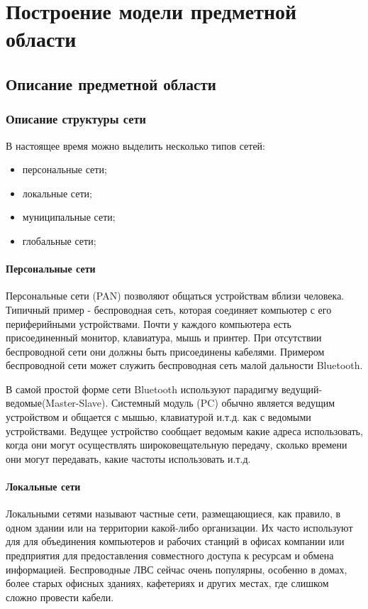 \newpage
\chapter{Построение модели предметной области}
    \section{Описание предметной области}
    \subsection{Описание структуры сети}

    В настоящее время можно выделить несколько типов сетей:
    \begin{itemize}
        \item персональные сети;
        \item локальные сети;
        \item муниципальные сети;
        \item глобальные сети;
    \end{itemize}

    \subsubsection{Персональные сети }

    Персональные сети (PAN) позволяют общаться устройствам вблизи человека. Типичный пример - беспроводная сеть, которая соединяет компьютер с его периферийными устройствами. Почти у каждого компьютера есть присоединенный монитор, клавиатура, мышь и принтер. При отсутствии беспроводной сети они должны быть присоединены кабелями. Примером беспроводной сети может служить беспроводная сеть малой дальности Bluetooth.

    В самой простой форме сети Bluetooth используют парадигму ведущий-ведомые(Master-Slave). Системный модуль (PC) обычно является ведущим устройством и общается с мышью, клавиатурой и.т.д. как с ведомыми устройствами. Ведущее устройство сообщает ведомым какие адреса использовать, когда они могут осуществлять широковещательную передачу, сколько времени они могут передавать, какие частоты использовать и.т.д.

    \subsubsection{Локальные сети}
    Локальными сетями называют частные сети, размещающиеся, как правило, в одном здании или на территории какой-либо организации. Их часто используют для для объединения компьютеров и рабочих станций в офисах компании или предприятия для предоставления совместного доступа к ресурсам и обмена информацией. Беспроводные ЛВС сейчас очень популярны, особенно в домах, более старых офисных зданиях, кафетериях и других местах, где слишком сложно провести кабели.

